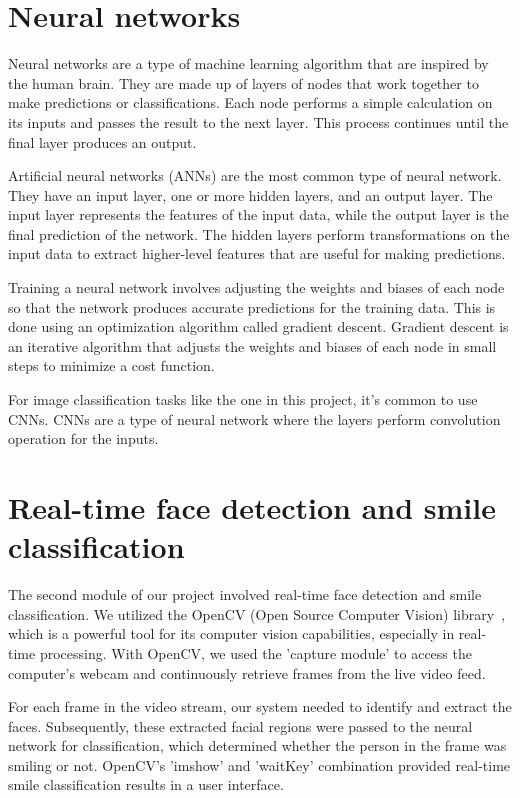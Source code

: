 \documentclass[12pt,a4paper,english
]{tunithesis}
\begin{document}
\setcounter{page}{1} 
\section{Neural networks}
Neural networks are a type of machine learning algorithm that are inspired by the human brain. They are made up of layers of nodes that work together to make predictions or classifications. Each node performs a simple calculation on its inputs and passes the result to the next layer. This process continues until the final layer produces an output.

Artificial neural networks (ANNs) are the most common type of neural network. They have an input layer, one or more hidden layers, and an output layer. The input layer represents the features of the input data, while the output layer is the final prediction of the network. The hidden layers perform transformations on the input data to extract higher-level features that are useful for making predictions.

Training a neural network involves adjusting the weights and biases of each node so that the network produces accurate predictions for the training data. This is done using an optimization algorithm called gradient descent. Gradient descent is an iterative algorithm that adjusts the weights and biases of each node in small steps to minimize a cost function.

For image classification tasks like the one in this project, it's common to use CNNs. CNNs are a type of neural network where the layers perform convolution operation for the inputs.~\cite{dlbook}

\section{Real-time face detection and smile classification}
The second module of our project involved real-time face detection and smile classification. We utilized the OpenCV (Open Source Computer Vision) library~\cite{opencv_library}, which is a powerful tool for its computer vision capabilities,  especially in real-time processing. With OpenCV, we used the 'capture module' to access the computer's webcam and continuously retrieve frames from the live video feed.

For each frame in the video stream, our system needed to identify and extract the faces. Subsequently, these extracted facial regions were passed to the neural network for classification, which determined whether the person in the frame was smiling or not. OpenCV's 'imshow' and 'waitKey' combination provided real-time smile classification results in a user interface.
\end{document}
